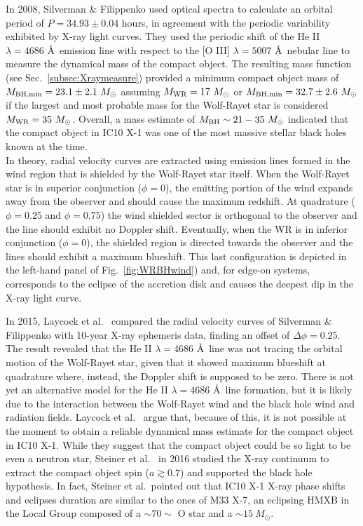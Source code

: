 \documentclass[a4paper,titlepage]{book}     	%
\newcommand{\sun}{\ensuremath{_\odot}}
\newcommand{\msun}{\ensuremath{M\sun}}
\newcommand{\mwr}{\ensuremath{M_\textup{WR}}}
\newcommand{\mbh}{\ensuremath{M_\textup{BH}}}
\begin{document}
In 2008, Silverman \& Filippenko used optical spectra to calculate an orbital period of $P = 34.93 \pm 0.04$ hours, in agreement with the periodic variability exhibited by X-ray light curves. They used the periodic shift of the He II $\lambda=4686$ \AA ~emission line with respect to the [O III] $\lambda=5007$ \AA ~nebular line to measure the dynamical mass of the compact object. The resulting mass function (see Sec.\ \ref{subsec:Xraymeasure}) provided a minimum compact object mass of $M_{\rm BH, min} = 23.1 \pm 2.1~\msun$ assuming $\mwr = 17~\msun$ or $M_{\rm BH, min} = 32.7 \pm 2.6~\msun$ if the largest and most probable mass for the Wolf-Rayet star is considered $\mwr = 35~\msun$. Overall, a mass estimate of $\mbh \sim 21-35~\msun$ indicated that the compact object in IC10 X-1 was one of the most massive stellar black holes known at the time. \\

In theory, radial velocity curves are extracted using emission lines formed in the wind region that is shielded by the Wolf-Rayet star itself. When the Wolf-Rayet star is in superior conjunction ($\phi = 0$), the emitting portion of the wind expands away from the observer and should cause the maximum redshift. At quadrature ($\phi = 0.25$ and $\phi = 0.75$) the wind shielded sector is orthogonal to the observer and the line should exhibit no Doppler shift. Eventually, when the WR is in inferior conjunction ($\phi = 0$), the shielded region is directed towards the observer and the lines should exhibit a maximum blueshift. This last configuration is depicted in the left-hand panel of Fig.\ \ref{fig:WRBHwind}) and, for edge-on systems, corresponds to the eclipse of the accretion disk and causes the deepest dip in the X-ray light curve.

In 2015, Laycock et al.\ \cite{laycock2015_IC10X1_measuredshift} compared the radial velocity curves of Silverman \& Filippenko with 10-year X-ray ephemeris data, finding an offset of $\Delta \phi = 0.25$. The result revealed that the He II $\lambda=4686$ \AA~line was not tracing the orbital motion of the Wolf-Rayet star, given that it showed maximum blueshift at quadrature  where, instead, the Doppler shift is supposed to be zero. There is not yet an alternative model for the He II $\lambda=4686$ \AA ~line formation, but it is likely due to the interaction between the Wolf-Rayet wind and the black hole wind and radiation fields. Laycock et al.\ \cite{ICX10X-1_Laycock2015_revisited} argue that, because of this, it is not possible at the moment to obtain a reliable dynamical mass estimate for the compact object in IC10 X-1. While they suggest that the compact object could be so light to be even a neutron star, Steiner et al.\ \cite{IC10X-1?Steiner2016spinBH} in 2016 studied the X-ray continuum to extract the compact object spin ($a \gtrsim 0.7$) and supported the black hole hypothesis. In fact, Steiner et al.\ pointed out that IC10 X-1 X-ray phase shifts and eclipses duration are similar to the ones of M33 X-7, an eclipsing HMXB in the Local Group composed of a $\sim 70\sim$ O star and a $\sim 15~\msun$.
\end{document}
